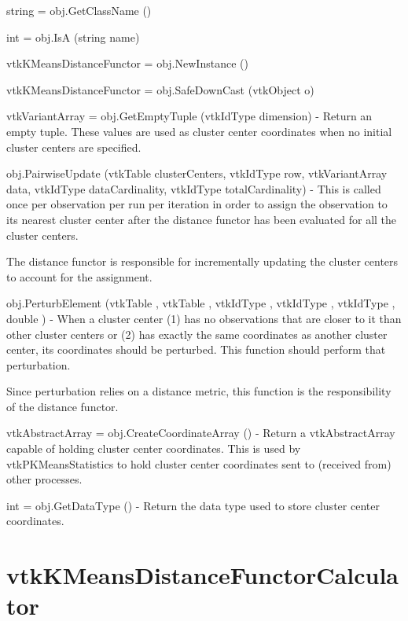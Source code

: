 \begin{DoxyItemize}
\item {\ttfamily string = obj.\-Get\-Class\-Name ()}  
\item {\ttfamily int = obj.\-Is\-A (string name)}  
\item {\ttfamily vtk\-K\-Means\-Distance\-Functor = obj.\-New\-Instance ()}  
\item {\ttfamily vtk\-K\-Means\-Distance\-Functor = obj.\-Safe\-Down\-Cast (vtk\-Object o)}  
\item {\ttfamily vtk\-Variant\-Array = obj.\-Get\-Empty\-Tuple (vtk\-Id\-Type dimension)} -\/ Return an empty tuple. These values are used as cluster center coordinates when no initial cluster centers are specified.  
\item {\ttfamily obj.\-Pairwise\-Update (vtk\-Table cluster\-Centers, vtk\-Id\-Type row, vtk\-Variant\-Array data, vtk\-Id\-Type data\-Cardinality, vtk\-Id\-Type total\-Cardinality)} -\/ This is called once per observation per run per iteration in order to assign the observation to its nearest cluster center after the distance functor has been evaluated for all the cluster centers.

The distance functor is responsible for incrementally updating the cluster centers to account for the assignment.  
\item {\ttfamily obj.\-Perturb\-Element (vtk\-Table , vtk\-Table , vtk\-Id\-Type , vtk\-Id\-Type , vtk\-Id\-Type , double )} -\/ When a cluster center (1) has no observations that are closer to it than other cluster centers or (2) has exactly the same coordinates as another cluster center, its coordinates should be perturbed. This function should perform that perturbation.

Since perturbation relies on a distance metric, this function is the responsibility of the distance functor.  
\item {\ttfamily vtk\-Abstract\-Array = obj.\-Create\-Coordinate\-Array ()} -\/ Return a vtk\-Abstract\-Array capable of holding cluster center coordinates. This is used by vtk\-P\-K\-Means\-Statistics to hold cluster center coordinates sent to (received from) other processes.  
\item {\ttfamily int = obj.\-Get\-Data\-Type ()} -\/ Return the data type used to store cluster center coordinates.  
\end{DoxyItemize}\hypertarget{vtkinfovis_vtkkmeansdistancefunctorcalculator}{}\section{vtk\-K\-Means\-Distance\-Functor\-Calculator}\label{vtkinfovis_vtkkmeansdistancefunctorcalculator}

